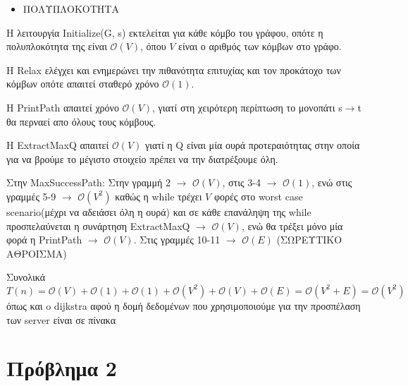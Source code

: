 \documentclass[a4paper,11pt]{article}
\begin{document}
\begin{itemize}
\item ΠΟΛΥΠΛΟΚΟΤΗΤΑ
\end{itemize}

Η λειτουργία Initialize(G, s) εκτελείται για κάθε κόμβο του γράφου, οπότε η πολυπλοκότητα της είναι $\mathcal{O}(V)$, όπου $V$ είναι ο αριθμός των κόμβων στο γράφο.

Η Relax ελέγχει και ενημερώνει την πιθανότητα επιτυχίας και τον προκάτοχο των κόμβων οπότε απαιτεί σταθερό χρόνο $\mathcal{O}(1)$.

Η PrintPath απαιτεί χρόνο $\mathcal{O}(V)$, γιατί στη χειρότερη περίπτωση το μονοπάτι s$\rightarrow$t θα περναεί απο όλους τους κόμβους.

Η ExtractMaxQ απαιτεί $\mathcal{O}(V)$ γιατί η Q είναι μία ουρά προτεραιότητας στην οποία για να βρούμε το μέγιστο στοιχείο πρέπει να την διατρέξουμε όλη.

Στην MaxSuccessPath:
Στην γραμμή 2 $\rightarrow$ $\mathcal{O}(V)$, στις 3-4 $\rightarrow$ $\mathcal{O}(1)$, ενώ στις γραμμές 5-9 $\rightarrow$ $\mathcal{O}(V^2)$ καθώς η while τρέχει $V$ φορές στο worst case scenario(μέχρι να αδειάσει όλη η ουρά) και σε κάθε επανάληψη της while προσπελαύνεται η συνάρτηση ΕxtractMaxQ $\rightarrow$ $\mathcal{O}(V)$, ενώ θα τρέξει μόνο μία φορά η PrintPath $\rightarrow$ $\mathcal{O}(V)$.
Στις γραμμές 10-11 $\rightarrow$ $\mathcal{O}(E)$ (ΣΩΡΕΥΤΙΚΟ ΑΘΡΟΙΣΜΑ)


Συνολικά {\color{red}$$T(n)=\mathcal{O}(V)+\mathcal{O}(1)+\mathcal{O}(1)+\mathcal{O}(V^2)+\mathcal{O}(V)+\mathcal{O}(E)=\mathcal{O}(V^2+E)=\mathcal{O}(V^2)$$} όπως και o dijkstra αφού η δομή δεδομένων που χρησιμοποιούμε για την προσπέλαση των server είναι σε πίνακα

\newpage

\section*{Πρόβλημα 2}
\end{document}

